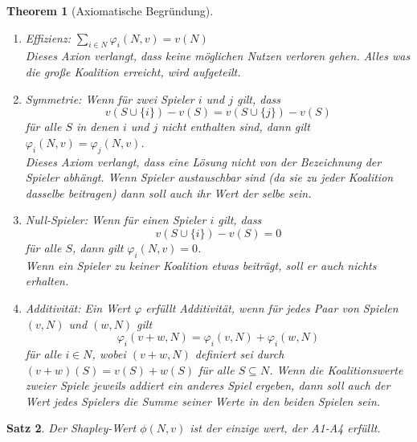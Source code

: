 \documentclass[12pt]{extreport} %
\theoremstyle{named}
\newtheorem{unnamedtheorem}{Theorem} \counterwithin{unnamedtheorem}{chapter}
\theoremstyle{itshape}
\newtheorem{satz}[unnamedtheorem]{Satz}
\theoremstyle{normal}
\begin{document}
\begin{unnamedtheorem}[Axiomatische Begründung] ~\
	\begin{enumerate}
		\item[A1] Effizienz: $\sum_{i \in N} \varphi_i(N,v) = v(N)$ ~\\
			\textit{Dieses Axion verlangt, dass keine möglichen Nutzen verloren gehen. Alles was die große Koalition erreicht, wird aufgeteilt.}
		\item[A2] Symmetrie: Wenn für zwei Spieler $i$ und $j$ gilt, dass
			$$ v\left( S \cup \{i\} \right) - v(S) = v\left( S \cup \{j\} \right) - v(S) $$
			für alle $S$ in denen $i$ und $j$ nicht enthalten sind, dann gilt $\varphi_i(N,v) = \varphi_j(N,v)$. ~\\
			\textit{Dieses Axiom verlangt, dass eine Lösung nicht von der Bezeichnung der Spieler abhängt. Wenn Spieler austauschbar sind (da sie zu jeder Koalition dasselbe beitragen) dann soll auch ihr Wert der selbe sein.}
		\item[A3] Null-Spieler: Wenn für einen Spieler $i$ gilt, dass
			$$ v\left( S \cup \{i\} \right) - v(S) = 0 $$
			für alle $S$, dann gilt $\varphi_i(N, v) = 0$. ~\\
			\textit{Wenn ein Spieler zu keiner Koalition etwas beiträgt, soll er auch nichts erhalten.}	
		\item[A4] Additivität: Ein Wert $\varphi$ erfüllt Additivität, wenn für jedes Paar von Spielen $(v, N)$ und $(w, N)$ gilt
			$$ \varphi_i(v + w, N) = \varphi_i(v, N) + \varphi_i(w, N) $$
			für alle $i \in N$, wobei $(v + w, N)$ definiert sei durch $(v + w)(S) = v(S) + w(S)$ für alle $S \subseteq N$.
			\textit{Wenn die Koalitionswerte zweier Spiele jeweils addiert ein anderes Spiel ergeben, dann soll auch der Wert jedes Spielers die Summe seiner Werte in den beiden Spielen sein.}
	\end{enumerate}
\end{unnamedtheorem}

\begin{satz}
	Der Shapley-Wert $\phi(N, v)$ ist der einzige wert, der A1-A4 erfüllt.
\end{satz}
\end{document}
